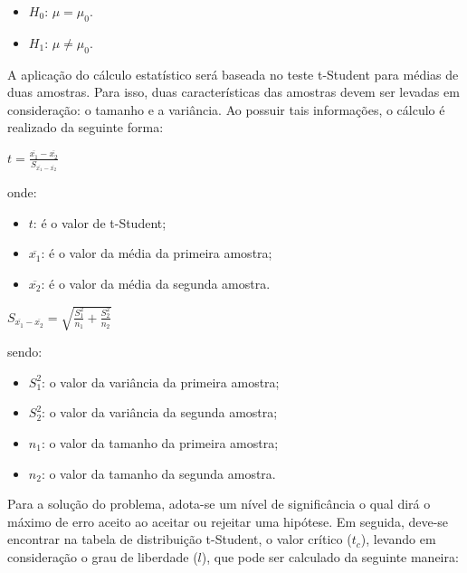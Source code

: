 \documentclass[pt,disc,oneside]{ufscpgeasthesis}
\begin{document}
				\begin{itemize}
					\item{$H_0$:} $\mu = \mu_0$.
					\item{$H_1$:} $\mu \neq \mu_0$.
				\end{itemize}

				A aplicação do cálculo estatístico será baseada no teste t-Student para médias de duas amostras.
				Para isso, duas características das amostras devem ser levadas em consideração: o tamanho e a variância.
				Ao possuir tais informações, o cálculo é realizado da seguinte forma:

				\begin{center}
					\LARGE{$t = \frac{\overline{x_1} - \overline{x_2}}{S_{\overline{x_1} - \overline{x_2}}}$}
				\end{center}

				onde:

				\begin{itemize}
					\item{\large\textbf{$t$}:} é o valor de t-Student;
					\item{\large\textbf{$\overline{x_1}$}:} é o valor da média da primeira amostra;
					\item{\large\textbf{$\overline{x_2}$}:} é o valor da média da segunda amostra.
				\end{itemize}

				\begin{center}
					\LARGE{$S_{\overline{x_1} - \overline{x_2}} = \sqrt{\frac{S_{1}^{2}}{n_1} + \frac{S_{2}^{2}}{n_2}}$}
				\end{center}

				sendo:

				\begin{itemize}
					\item{\large\textbf{$S_{1}^{2}$}:} o valor da variância da primeira amostra;
					\item{\large\textbf{$S_{2}^{2}$}:} o valor da variância da segunda amostra;
					\item{\large\textbf{$n_1$}:} o valor da tamanho da primeira amostra;
					\item{\large\textbf{$n_2$}:} o valor da tamanho da segunda amostra.
				\end{itemize}

				Para a solução do problema, adota-se um nível de significância o qual dirá o máximo de erro aceito ao aceitar ou rejeitar uma hipótese.
				Em seguida, deve-se encontrar na tabela de distribuição t-Student, o valor crítico ($t_c$), levando em consideração o grau de liberdade ($l$), que pode ser calculado da seguinte maneira:
\end{document}
